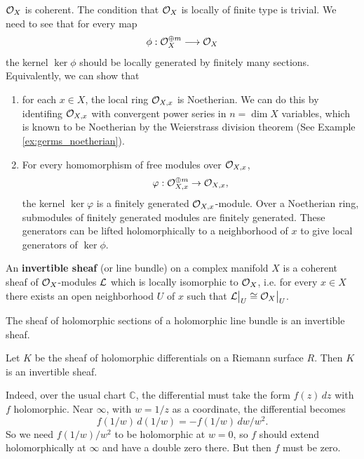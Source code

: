\documentclass[12pt]{article}
\begin{document}
\begin{example}
    ${\mathcal{O}}_X$ is coherent. The condition that ${\mathcal{O}}_X$ is locally of finite type is trivial. We need to see that for every map
\[
\phi:{\mathcal{O}}_X^{\oplus m} \longrightarrow {\mathcal{O}}_X
\]
the kernel $\ker\phi$ should be locally generated by finitely many sections. Equivalently, we can show that \begin{enumerate}
    \item for each $x\in X$, the local ring \({\mathcal{O}}_{X,x}\) is Noetherian. We can do this by identifing \({\mathcal{O}}_{X,x}\) with convergent power series in \(n=\dim X\) variables, which is known to be Noetherian by the Weierstrass division theorem (See Example \ref{ex:germs_noetherian}).
    \item For every homomorphism of free modules over \({\mathcal{O}}_{X,x}\),
\[
\varphi:{\mathcal{O}}_{X,x}^{\oplus m}\to {\mathcal{O}}_{X,x},
\]
the kernel $\ker\varphi$ is a finitely generated \({\mathcal{O}}_{X,x}\)-module. Over a Noetherian ring, submodules of finitely generated modules are finitely generated. These generators can be lifted holomorphically to a neighborhood of $x$ to give local generators of $\ker\phi$.
\end{enumerate}
\end{example}

\begin{definition}
    An \textbf{invertible sheaf} (or line bundle) on a complex manifold $X$ is a coherent sheaf of ${\mathcal{O}}_X$-modules ${\mathcal{L}}$ which is locally isomorphic to ${\mathcal{O}}_X$, i.e. for every $x \in X$ there exists an open neighborhood $U$ of $x$ such that \({\mathcal{L}}\big|_U \cong {\mathcal{O}}_X\big|_U\).
\end{definition}

\begin{example}
    The sheaf of holomorphic sections of a holomorphic line bundle is an invertible sheaf.
\end{example}

\begin{example}
    Let $K$ be the sheaf of holomorphic differentials on a Riemann surface $R$. Then $K$ is an invertible sheaf.
\end{example}

\begin{example}
Indeed, over the usual chart $\mathbb{C}$, the differential must take the form $f(z)\,dz$ with $f$ holomorphic.  
Near $\infty$, with $w = 1/z$ as a coordinate, the differential becomes
\[
f(1/w)\,d(1/w) = -f(1/w)\,dw/w^2.
\]
So we need $f(1/w)/w^2$ to be holomorphic at $w = 0$, so $f$ should extend holomorphically at $\infty$ and have a double zero there. But then $f$ must be zero.
\end{example}
\end{document}
